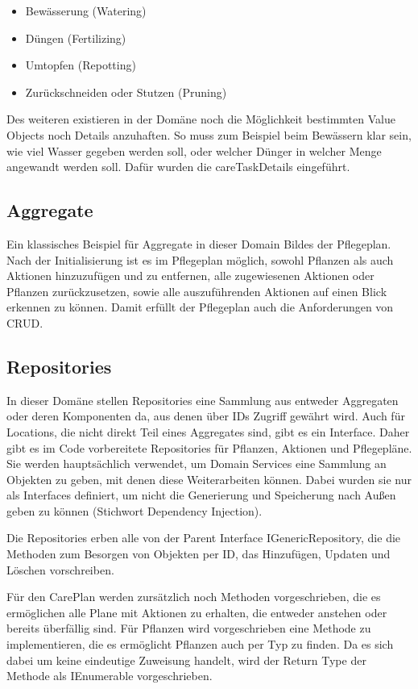 \begin{itemize}
	\item Bewässerung (Watering)
	\item Düngen (Fertilizing)
	\item Umtopfen (Repotting)
	\item Zurückschneiden oder Stutzen (Pruning)
\end{itemize}

Des weiteren existieren in der Domäne noch die Möglichkeit bestimmten Value Objects noch Details anzuhaften. So muss zum Beispiel beim Bewässern klar sein, wie viel Wasser gegeben werden soll, oder welcher Dünger in welcher Menge angewandt werden soll. Dafür wurden die careTaskDetails eingeführt.

\subsection*{Aggregate}
Ein klassisches Beispiel für Aggregate in dieser Domain Bildes der Pflegeplan. Nach der Initialisierung ist es im Pflegeplan möglich, sowohl Pflanzen als auch Aktionen hinzuzufügen und zu entfernen, alle zugewiesenen Aktionen oder Pflanzen zurückzusetzen, sowie alle auszuführenden Aktionen auf einen Blick erkennen zu können. Damit erfüllt der Pflegeplan auch die Anforderungen von CRUD.

\subsection*{Repositories}
In dieser Domäne stellen Repositories eine Sammlung aus entweder Aggregaten oder deren Komponenten da, aus denen über IDs Zugriff gewährt wird. Auch für Locations, die nicht direkt Teil eines Aggregates sind, gibt es ein Interface. Daher gibt es im Code vorbereitete Repositories für Pflanzen, Aktionen und Pflegepläne. Sie werden hauptsächlich verwendet, um Domain Services eine Sammlung an Objekten zu geben, mit denen diese Weiterarbeiten können. Dabei wurden sie nur als Interfaces definiert, um nicht die Generierung und Speicherung nach Außen geben zu können (Stichwort Dependency Injection). 
\par
Die Repositories erben alle von der Parent Interface IGenericRepository, die die Methoden zum Besorgen von Objekten per ID, das Hinzufügen, Updaten und Löschen vorschreiben. 
\par
Für den CarePlan werden zursätzlich noch Methoden vorgeschrieben, die es ermöglichen alle Plane mit Aktionen zu erhalten, die entweder anstehen oder bereits überfällig sind. Für Pflanzen wird vorgeschrieben eine Methode zu implementieren, die es ermöglicht Pflanzen auch per Typ zu finden. Da es sich dabei um keine eindeutige Zuweisung handelt, wird der Return Type der Methode als IEnumerable vorgeschrieben.

